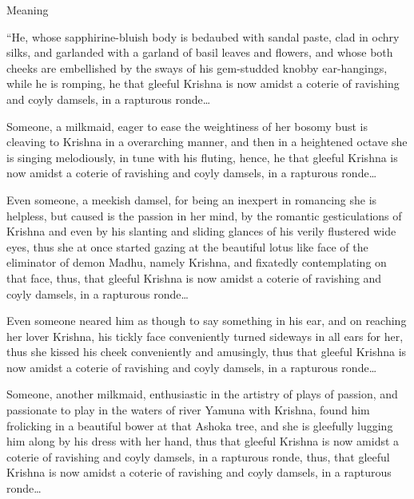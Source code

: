 Meaning

\begin{myquote}
“He, whose sapphirine-bluish body is bedaubed with sandal paste, clad in ochry silks, and garlanded with a garland of basil leaves and flowers, and whose both cheeks are embellished by the sways of his gem-studded knobby ear-hangings, while he is romping, he that gleeful Krishna is now amidst a coterie of ravishing and coyly damsels, in a rapturous ronde…
\end{myquote}

\newpage

\begin{myquote}
Someone, a milkmaid, eager to ease the weightiness of her bosomy bust is cleaving to Krishna in a overarching manner, and then in a heightened octave she is singing melodiously, in tune with his fluting, hence, he that gleeful Krishna is now amidst a coterie of ravishing and coyly damsels, in a rapturous ronde…
\end{myquote}

\begin{myquote}
Even someone, a meekish damsel, for being an inexpert in romancing she is helpless, but caused is the passion in her mind, by the romantic gesticulations of Krishna and even by his slanting and sliding glances of his verily flustered wide eyes, thus she at once started gazing at the beautiful lotus like face of the eliminator of demon Madhu, namely Krishna, and fixatedly contemplating on that face, thus, that gleeful Krishna is now amidst a coterie of ravishing and coyly damsels, in a rapturous ronde…
\end{myquote}

\begin{myquote}
Even someone neared him as though to say something in his ear, and on reaching her lover Krishna, his tickly face conveniently turned sideways in all ears for her, thus she kissed his cheek conveniently and amusingly, thus that gleeful Krishna is now amidst a coterie of ravishing and coyly damsels, in a rapturous ronde…
\end{myquote}

\begin{myquote}
Someone, another milkmaid, enthusiastic in the artistry of plays of passion, and passionate to play in the waters of river Yamuna with Krishna, found him frolicking in a beautiful bower at that Ashoka tree, and she is gleefully lugging him along by his dress with her hand, thus that gleeful Krishna is now amidst a coterie of ravishing and coyly damsels, in a rapturous ronde, thus, that gleeful Krishna is now amidst a coterie of ravishing and coyly damsels, in a rapturous ronde…
\end{myquote}


